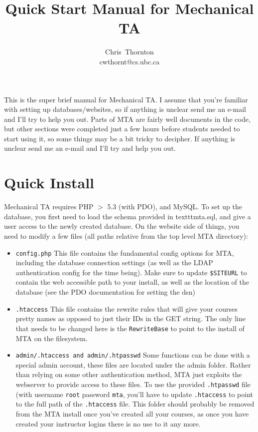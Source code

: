 \documentclass[11pt,letterpaper,oneside]{article}
\begin{document}
\title{Quick Start Manual for Mechanical TA}

\author{
Chris~Thornton\\
cwthornt@cs.ubc.ca
}

\maketitle

\tableofcontents

This is the super brief manual for Mechanical TA. I assume that you're familiar with setting up databases/websites, so if anything is unclear send me an e-mail and I'll try to help you out. Parts of MTA are fairly well documents in the code, but other sections were completed just a few hours before students needed to start using it, so some things may be a bit tricky to decipher. If anything is unclear send me an e-mail and I'll try and help you out.

\section{Quick Install}

Mechanical TA requires PHP $>$ 5.3 (with PDO), and MySQL. To set up the database, you first need to load the schema provided in texttt{mta.sql}, and give a user access to the newly created database. On the website side of things, you need to modify a few files (all paths relative from the top level MTA directory):

\begin{itemize}
  \item \texttt{config.php} This file contains the fundamental config options for MTA, including the database connection settings (as well as the LDAP authentication config for the time being). Make sure to update \texttt{\$SITEURL} to contain the web accessible path to your install, as well as the location of the database (see the PDO documentation for setting the dsn)
  \item \texttt{.htaccess} This file contains the rewrite rules that will give your courses pretty names as opposed to just their IDs in the GET string. The only line that needs to be changed here is the \texttt{RewriteBase} to point to the install of MTA on the filesystem.
  \item \texttt{admin/.htaccess and admin/.htpasswd} Some functions can be done with a special admin account, these files are located under the admin folder. Rather than relying on some other authentication method, MTA just exploits the webserver to provide access to these files. To use the provided \texttt{.htpasswd} file (with username \texttt{root} password \texttt{mta},  you'll have to update \texttt{.htaccess} to point to the full path of the \texttt{.htaccess} file. This folder should probably be removed from the MTA install once you've created all your courses, as once you have created your instructor logins there is no use to it any more.
\end{itemize}
\end{document}
